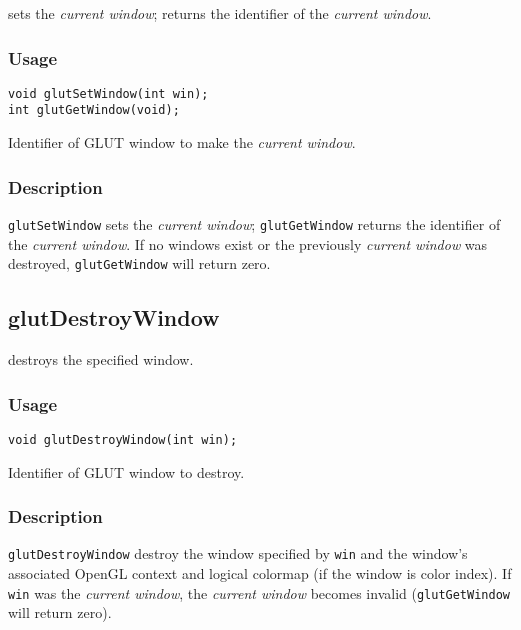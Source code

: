  sets the {\em current window}; 
returns the identifier of the {\em current window}.

\subsubsection*{Usage}
\begin{verbatim}
void glutSetWindow(int win);
int glutGetWindow(void);
\end{verbatim}
\begin{description}
\itemsep 0in
\item[\tt win]
Identifier of GLUT window to make the {\em current window}.
\end{description}

\subsubsection*{Description}

{\tt glutSetWindow} sets the {\em current window}; {\tt glutGetWindow}
returns the identifier of the {\em current window}.
If no windows exist or the previously {\em current window} was destroyed, {\tt glutGetWindow}
will return zero.

\subsection{glutDestroyWindow}

 destroys the specified window.

\subsubsection*{Usage}
\begin{verbatim}
void glutDestroyWindow(int win);
\end{verbatim}
\begin{description}
\itemsep 0in
\item[\tt win]
Identifier of GLUT window to destroy.
\end{description}

\subsubsection*{Description}

{\tt glutDestroyWindow} destroy the window specified by {\tt win} and the window's
associated OpenGL context and logical colormap (if the window is color index).  If {\tt win} was
the {\em current window}, the {\em current window} becomes
invalid ({\tt glutGetWindow} will return zero).

